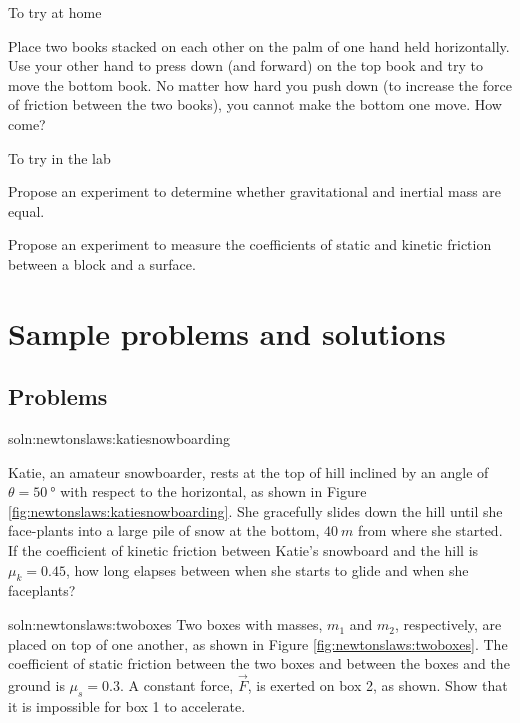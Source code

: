 \begin{chapteractivity}{To try at home}
{
\item Place two books stacked on each other on the palm of one hand held horizontally. Use your other hand to press down (and forward) on the top book and try to move the bottom book. No matter how hard you push down (to increase the force of friction between the two books), you cannot make the bottom one move. How come?
}
\end{chapteractivity}

\begin{chapteractivity}{To try in the lab}
{
\item Propose an experiment to determine whether gravitational and inertial mass are equal.
\item Propose an experiment to measure the coefficients of static and kinetic friction between a block and a surface.
}
\end{chapteractivity}
\newpage
\section{Sample problems and solutions}
\subsection{Problems}
\begin{problem}{soln:newtonslaws:katiesnowboarding}{\label{prob:newtonslaws:katiesnowboarding}

Katie, an amateur snowboarder, rests at the top of hill inclined by an angle of $\theta =\SI{50}{\degree}$ with respect to the horizontal, as shown in Figure \ref{fig:newtonslaws:katiesnowboarding}. She gracefully slides down the hill until she face-plants into a large pile of snow at the bottom, $\SI{40}{m}$ from where she started. If the coefficient of kinetic friction between Katie's snowboard and the hill is $\mu_k=0.45$, how long elapses between when she starts to glide and when she faceplants?}
\end{problem}


\begin{problem}{soln:newtonslaws:twoboxes}{
\label{prob:newtonslaws:twoboxes}
Two boxes with masses, $m_1$ and $m_2$, respectively, are placed on top of one another, as shown in Figure \ref{fig:newtonslaws:twoboxes}. The coefficient of static friction between the two boxes and between the boxes and the ground is $\mu_s=0.3$. A constant force, $\vec F$, is exerted on box 2, as shown. Show that it is impossible for box 1 to accelerate.
}
\end{problem}

